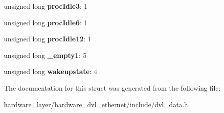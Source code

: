 \begin{DoxyCompactItemize}
unsigned long {\bfseries proc\+Idle3}\+: 1
\item 
\mbox{\label{structDVLstatus_a1f37cf4fe49c9e75e7d558514e3df69e}} 
unsigned long {\bfseries proc\+Idle6}\+: 1
\item 
\mbox{\label{structDVLstatus_a6a93208697cce85f8bf509bc138668f2}} 
unsigned long {\bfseries proc\+Idle12}\+: 1
\item 
\mbox{\label{structDVLstatus_a88cdaf75532d8e9b4a866c1e1505bf22}} 
unsigned long {\bfseries \+\_\+empty1}\+: 5
\item 
\mbox{\label{structDVLstatus_a732333bfd4d841915d049961e860cc91}} 
unsigned long {\bfseries wakeupstate}\+: 4
\end{DoxyCompactItemize}


The documentation for this struct was generated from the following file\+:\begin{DoxyCompactItemize}
\item 
hardware\+\_\+layer/hardware\+\_\+dvl\+\_\+ethernet/include/dvl\+\_\+data.\+h\end{DoxyCompactItemize}
